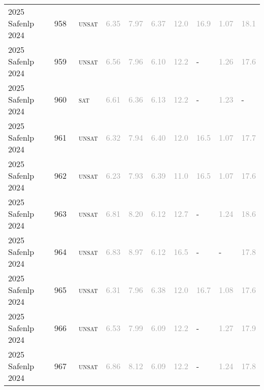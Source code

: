\begin{center}
{\begin{longtable}{@{}llllllllll@{}}
2025 Safenlp 2024 & 958 & ~\textsc{unsat} & \textcolor{darkgray}{6.35} & \textcolor{darkgray}{7.97} & \textcolor{darkgray}{6.37} & \textcolor{darkgray}{12.0} & \textcolor{darkgray}{16.9} & \textcolor{darkgray}{1.07} & \textcolor{darkgray}{18.1} \\
2025 Safenlp 2024 & 959 & ~\textsc{unsat} & \textcolor{darkgray}{6.56} & \textcolor{darkgray}{7.96} & \textcolor{darkgray}{6.10} & \textcolor{darkgray}{12.2} & - & \textcolor{darkgray}{1.26} & \textcolor{darkgray}{17.6} \\
2025 Safenlp 2024 & 960 & ~\textsc{sat} & \textcolor{darkgray}{6.61} & \textcolor{darkgray}{6.36} & \textcolor{darkgray}{6.13} & \textcolor{darkgray}{12.2} & - & \textcolor{darkgray}{1.23} & - \\
2025 Safenlp 2024 & 961 & ~\textsc{unsat} & \textcolor{darkgray}{6.32} & \textcolor{darkgray}{7.94} & \textcolor{darkgray}{6.40} & \textcolor{darkgray}{12.0} & \textcolor{darkgray}{16.5} & \textcolor{darkgray}{1.07} & \textcolor{darkgray}{17.7} \\
2025 Safenlp 2024 & 962 & ~\textsc{unsat} & \textcolor{darkgray}{6.23} & \textcolor{darkgray}{7.93} & \textcolor{darkgray}{6.39} & \textcolor{darkgray}{11.0} & \textcolor{darkgray}{16.5} & \textcolor{darkgray}{1.07} & \textcolor{darkgray}{17.6} \\
2025 Safenlp 2024 & 963 & ~\textsc{unsat} & \textcolor{darkgray}{6.81} & \textcolor{darkgray}{8.20} & \textcolor{darkgray}{6.12} & \textcolor{darkgray}{12.7} & - & \textcolor{darkgray}{1.24} & \textcolor{darkgray}{18.6} \\
2025 Safenlp 2024 & 964 & ~\textsc{unsat} & \textcolor{darkgray}{6.83} & \textcolor{darkgray}{8.97} & \textcolor{darkgray}{6.12} & \textcolor{darkgray}{16.5} & - & - & \textcolor{darkgray}{17.8} \\
2025 Safenlp 2024 & 965 & ~\textsc{unsat} & \textcolor{darkgray}{6.31} & \textcolor{darkgray}{7.96} & \textcolor{darkgray}{6.38} & \textcolor{darkgray}{12.0} & \textcolor{darkgray}{16.7} & \textcolor{darkgray}{1.08} & \textcolor{darkgray}{17.6} \\
2025 Safenlp 2024 & 966 & ~\textsc{unsat} & \textcolor{darkgray}{6.53} & \textcolor{darkgray}{7.99} & \textcolor{darkgray}{6.09} & \textcolor{darkgray}{12.2} & - & \textcolor{darkgray}{1.27} & \textcolor{darkgray}{17.9} \\
2025 Safenlp 2024 & 967 & ~\textsc{unsat} & \textcolor{darkgray}{6.86} & \textcolor{darkgray}{8.12} & \textcolor{darkgray}{6.09} & \textcolor{darkgray}{12.2} & - & \textcolor{darkgray}{1.24} & \textcolor{darkgray}{17.8} \\

\end{longtable}}
\end{center}
